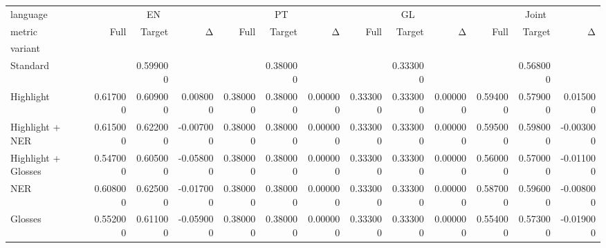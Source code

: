 \begin{tabular}{lrrrrrrrrrrrr}
\toprule
language & \multicolumn{3}{c}{EN} & \multicolumn{3}{c}{PT} & \multicolumn{3}{c}{GL} & \multicolumn{3}{c}{Joint} \\
metric & Full & Target & Δ & Full & Target & Δ & Full & Target & Δ & Full & Target & Δ \\
variant &  &  &  &  &  &  &  &  &  &  &  &  \\
\midrule
Standard &  & 0.599000 &  &  & 0.380000 &  &  & 0.333000 &  &  & 0.568000 &  \\
Highlight & 0.617000 & 0.609000 & 0.008000 & 0.380000 & 0.380000 & 0.000000 & 0.333000 & 0.333000 & 0.000000 & 0.594000 & 0.579000 & 0.015000 \\
Highlight + NER & 0.615000 & 0.622000 & -0.007000 & 0.380000 & 0.380000 & 0.000000 & 0.333000 & 0.333000 & 0.000000 & 0.595000 & 0.598000 & -0.003000 \\
Highlight + Glosses & 0.547000 & 0.605000 & -0.058000 & 0.380000 & 0.380000 & 0.000000 & 0.333000 & 0.333000 & 0.000000 & 0.560000 & 0.570000 & -0.011000 \\
NER & 0.608000 & 0.625000 & -0.017000 & 0.380000 & 0.380000 & 0.000000 & 0.333000 & 0.333000 & 0.000000 & 0.587000 & 0.596000 & -0.008000 \\
Glosses & 0.552000 & 0.611000 & -0.059000 & 0.380000 & 0.380000 & 0.000000 & 0.333000 & 0.333000 & 0.000000 & 0.554000 & 0.573000 & -0.019000 \\
\bottomrule
\end{tabular}
